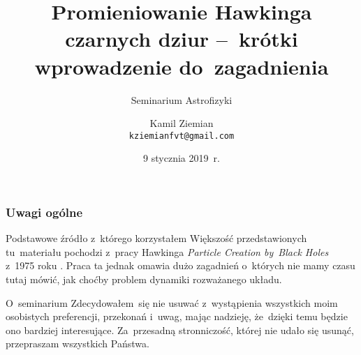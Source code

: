 \documentclass{beamer}  %
\title[Promieniowanie Hawkinga]{Promieniowanie Hawkinga czarnych dziur
  --~krótki wprowadzenie do~zagadnienia}
\subtitle{Seminarium Astrofizyki}
\author{Kamil Ziemian \\
  \texttt{kziemianfvt@gmail.com} }
\institute{Zakład Teorii Pola, \\
  Uniwersytet Jagielloński w~Krakowie}
\date[9 stycznia 2019~r.]{9 stycznia 2019~r.}
\begin{document}



\begin{frame}
  \titlepage
\end{frame}








\begin{frame}
  \frametitle{Uwagi ogólne}

  \begin{block}{Podstawowe źródło z~którego korzystałem}
    Większość przedstawionych tu~materiału pochodzi z~pracy Hawkinga
    \emph{Particle Creation by~Black Holes} z~1975 roku
    \cite{HawkingParticleCreationByBlackHole1975}. Praca ta jednak
    omawia dużo zagadnień o~których nie mamy czasu tutaj mówić, jak
    choćby problem dynamiki rozważanego układu.
  \end{block}


  \begin{block}{O~seminarium}
    Zdecydowałem~się nie usuwać z~wystąpienia wszystkich moim
    osobistych preferencji, przekonań i~uwag, mając nadzieję,
    że~dzięki temu będzie ono bardziej interesujące.
    Za~przesadną stronniczość, której nie udało się usunąć,
    przepraszam wszystkich Państwa.
  \end{block}

\end{frame}





\end{document}
